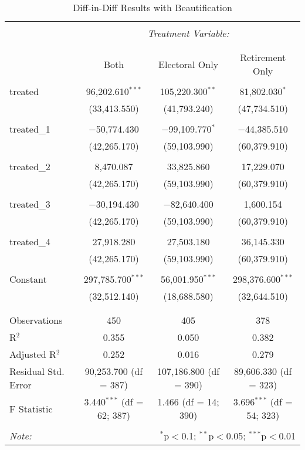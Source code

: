 \begin{table}[H] \centering 
  \caption{Diff-in-Diff Results with Beautification} 
  \label{} 
\begin{tabular}{@{\extracolsep{5pt}}lccc} 
\\[-1.8ex]\hline 
\hline \\[-1.8ex] 
 & \multicolumn{3}{c}{\textit{Treatment Variable:}} \\ 
\cline{2-4} 
\\
\\[-1.8ex] & Both & Electoral Only & Retirement Only\\ 
\hline \\[-1.8ex] 
 treated & 96,202.610$^{***}$ & 105,220.300$^{**}$ & 81,802.030$^{*}$ \\ 
  & (33,413.550) & (41,793.240) & (47,734.510) \\ 
  & & & \\ 
 treated\_1 & $-$50,774.430 & $-$99,109.770$^{*}$ & $-$44,385.510 \\ 
  & (42,265.170) & (59,103.990) & (60,379.910) \\ 
  & & & \\ 
 treated\_2 & 8,470.087 & 33,825.860 & 17,229.070 \\ 
  & (42,265.170) & (59,103.990) & (60,379.910) \\ 
  & & & \\ 
 treated\_3 & $-$30,194.430 & $-$82,640.400 & 1,600.154 \\ 
  & (42,265.170) & (59,103.990) & (60,379.910) \\ 
  & & & \\ 
 treated\_4 & 27,918.280 & 27,503.180 & 36,145.330 \\ 
  & (42,265.170) & (59,103.990) & (60,379.910) \\ 
  & & & \\ 
 Constant & 297,785.700$^{***}$ & 56,001.950$^{***}$ & 298,376.600$^{***}$ \\ 
  & (32,512.140) & (18,688.580) & (32,644.510) \\ 
  & & & \\ 
\hline \\[-1.8ex] 
Observations & 450 & 405 & 378 \\ 
R$^{2}$ & 0.355 & 0.050 & 0.382 \\ 
Adjusted R$^{2}$ & 0.252 & 0.016 & 0.279 \\ 
Residual Std. Error & 90,253.700 (df = 387) & 107,186.800 (df = 390) & 89,606.330 (df = 323) \\ 
F Statistic & 3.440$^{***}$ (df = 62; 387) & 1.466 (df = 14; 390) & 3.696$^{***}$ (df = 54; 323) \\ 
\hline 
\hline \\[-1.8ex] 
\textit{Note:}  & \multicolumn{3}{r}{$^{*}$p$<$0.1; $^{**}$p$<$0.05; $^{***}$p$<$0.01} \\ 
\end{tabular} 
\end{table} 